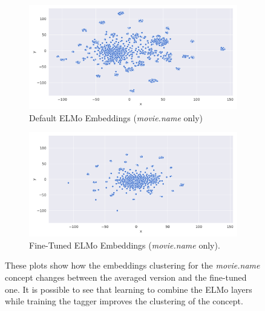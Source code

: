 \documentclass[11pt,a4paper]{article}
\begin{document}
\begin{figure}[t]
\begin{subfigure}{0.5\linewidth}
  \centering
  \includegraphics[width=\linewidth]{img/elmo-embeddings-not-trained-2D.png}
  \caption{Default ELMo Embeddings (\textit{movie.name} only)}
  \label{fig:sfig1}
\end{subfigure}%
\begin{subfigure}{0.5\linewidth}
  \centering
  \includegraphics[width=\linewidth]{img/elmo-embeddings-trained-2D.png}
  \caption{Fine-Tuned ELMo Embeddings (\textit{movie.name} only).}
  \label{fig:sfig2}
\end{subfigure}%
\caption{These plots show how the embeddings clustering for the \textit{movie.name} concept changes between the averaged version and the fine-tuned one. It is possible to see that learning to combine the ELMo layers while training the tagger improves the clustering of the concept.}
\label{fig:fine-tuned-emb}
\end{figure}
\end{document}
